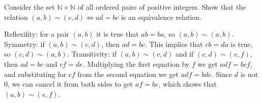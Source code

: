 \documentclass[solution, letterpaper]{cs20}
\begin{document}
\solution

\subsolution
\subsolution
\subsolution


Consider the set $\mathbb{N} \times \mathbb{N}$ of all ordered pairs of positive integers. Show that the relation $(a, b) \sim (c,d) \iff ad = bc$ is an equivalence relation.

\solution

\subsolution Reflexifity: for a pair $(a, b)$ it is true that $ab = ba$, so $(a, b) \sim (a, b)$.
\subsolution Symmetry: if $(a, b) \sim (c, d)$, then $ad = bc$. This implies that $cb = da$ is true, so $(c, d) \sim (a, b)$.
\subsolution Transitivity: if $(a, b) \sim (c, d)$ and if $(c, d) \sim (e, f)$, then $ad = bc$ and $cf = de$. Multiplying the first equation by $f$ we get $adf = bcf$, and substituting for $cf$ from the second equation we get $adf = bde$. Since $d$ is not 0, we can cancel it from both sides to get $af = be$, which shows that $(a, b) \sim (e, f)$.
\end{document}

